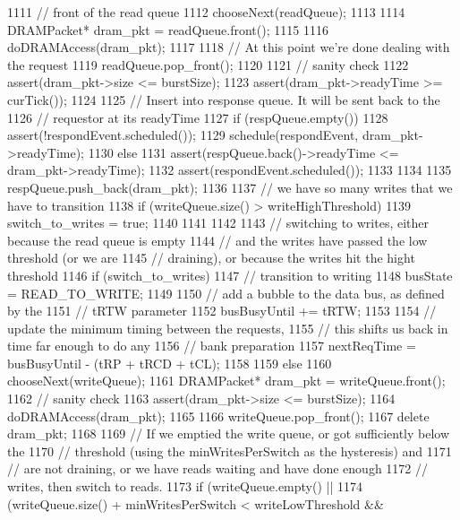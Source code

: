 \begin{DoxyCode}
{{{1111             // front of the read queue
1112             chooseNext(readQueue);
1113 
1114             DRAMPacket* dram_pkt = readQueue.front();
1115 
1116             doDRAMAccess(dram_pkt);
1117 
1118             // At this point we're done dealing with the request
1119             readQueue.pop_front();
1120 
1121             // sanity check
1122             assert(dram_pkt->size <= burstSize);
1123             assert(dram_pkt->readyTime >= curTick());
1124 
1125             // Insert into response queue. It will be sent back to the
1126             // requestor at its readyTime
1127             if (respQueue.empty()) {
1128                 assert(!respondEvent.scheduled());
1129                 schedule(respondEvent, dram_pkt->readyTime);
1130             } else {
1131                 assert(respQueue.back()->readyTime <= dram_pkt->readyTime);
1132                 assert(respondEvent.scheduled());
1133             }
1134 
1135             respQueue.push_back(dram_pkt);
1136 
1137             // we have so many writes that we have to transition
1138             if (writeQueue.size() > writeHighThreshold) {
1139                 switch_to_writes = true;
1140             }
1141         }
1142 
1143         // switching to writes, either because the read queue is empty
1144         // and the writes have passed the low threshold (or we are
1145         // draining), or because the writes hit the hight threshold
1146         if (switch_to_writes) {
1147             // transition to writing
1148             busState = READ_TO_WRITE;
1149 
1150             // add a bubble to the data bus, as defined by the
1151             // tRTW parameter
1152             busBusyUntil += tRTW;
1153 
1154             // update the minimum timing between the requests,
1155             // this shifts us back in time far enough to do any
1156             // bank preparation
1157             nextReqTime = busBusyUntil - (tRP + tRCD + tCL);
1158         }
1159     } else {
1160         chooseNext(writeQueue);
1161         DRAMPacket* dram_pkt = writeQueue.front();
1162         // sanity check
1163         assert(dram_pkt->size <= burstSize);
1164         doDRAMAccess(dram_pkt);
1165 
1166         writeQueue.pop_front();
1167         delete dram_pkt;
1168 
1169         // If we emptied the write queue, or got sufficiently below the
1170         // threshold (using the minWritesPerSwitch as the hysteresis) and
1171         // are not draining, or we have reads waiting and have done enough
1172         // writes, then switch to reads.
1173         if (writeQueue.empty() ||
1174             (writeQueue.size() + minWritesPerSwitch < writeLowThreshold &&
}}
\end{DoxyCode}
